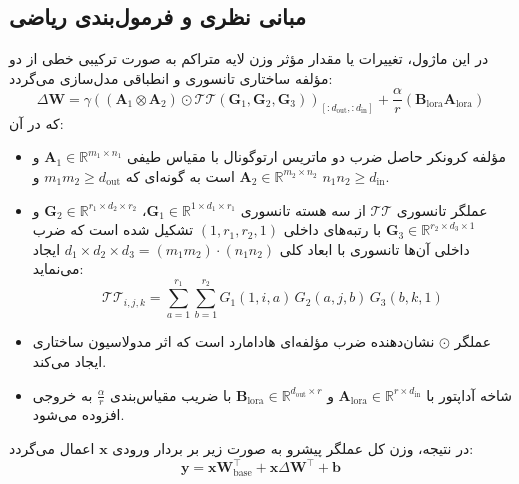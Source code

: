 \subsection{مبانی نظری و فرمول‌بندی ریاضی}
در این ماژول، تغییرات یا مقدار مؤثر وزن لایه متراکم به صورت ترکیبی خطی از دو مؤلفه ساختاری تانسوری و انطباقی مدل‌سازی می‌گردد:
\begin{equation}
\Delta \mathbf{W} = \gamma \left( (\mathbf{A}_1 \otimes \mathbf{A}_2) \odot \mathcal{TT}(\mathbf{G}_1, \mathbf{G}_2, \mathbf{G}_3) \right)_{[:d_{\text{out}}, :d_{\text{in}}]} + \frac{\alpha}{r} (\mathbf{B}_{\text{lora}} \mathbf{A}_{\text{lora}})
\end{equation}
که در آن:
\begin{itemize}
    \item مؤلفه کرونکر حاصل ضرب دو ماتریس ارتوگونال با مقیاس طیفی $\mathbf{A}_1 \in \mathbb{R}^{m_1 \times n_1}$ و $\mathbf{A}_2 \in \mathbb{R}^{m_2 \times n_2}$ است به گونه‌ای که $m_1 m_2 \ge d_{\text{out}}$ و $n_1 n_2 \ge d_{\text{in}}$.
    \item عملگر تانسوری $\mathcal{TT}$ از سه هسته تانسوری $\mathbf{G}_1 \in \mathbb{R}^{1 \times d_1 \times r_1}$، $\mathbf{G}_2 \in \mathbb{R}^{r_1 \times d_2 \times r_2}$ و $\mathbf{G}_3 \in \mathbb{R}^{r_2 \times d_3 \times 1}$ با رتبه‌های داخلی $(1, r_1, r_2, 1)$ تشکیل شده است که ضرب داخلی آن‌ها تانسوری با ابعاد کلی $d_1 \times d_2 \times d_3 = (m_1 m_2) \cdot (n_1 n_2)$ ایجاد می‌نماید:
    \begin{equation}
    \mathcal{TT}_{i, j, k} = \sum_{a=1}^{r_1} \sum_{b=1}^{r_2} G_{1}(1, i, a) \, G_{2}(a, j, b) \, G_{3}(b, k, 1)
    \end{equation}
    \item عملگر $\odot$ نشان‌دهنده ضرب مؤلفه‌ای هادامارد است که اثر مدولاسیون ساختاری ایجاد می‌کند.
    \item شاخه آداپتور با $\mathbf{A}_{\text{lora}} \in \mathbb{R}^{r \times d_{\text{in}}}$ و $\mathbf{B}_{\text{lora}} \in \mathbb{R}^{d_{\text{out}} \times r}$ با ضریب مقیاس‌بندی $\frac{\alpha}{r}$ به خروجی افزوده می‌شود.
\end{itemize}

در نتیجه، وزن کل عملگر پیشرو به صورت زیر بر بردار ورودی $\mathbf{x}$ اعمال می‌گردد:
\begin{equation}
\mathbf{y} = \mathbf{x} \mathbf{W}_{\text{base}}^\top + \mathbf{x} \Delta \mathbf{W}^\top + \mathbf{b}
\end{equation}

